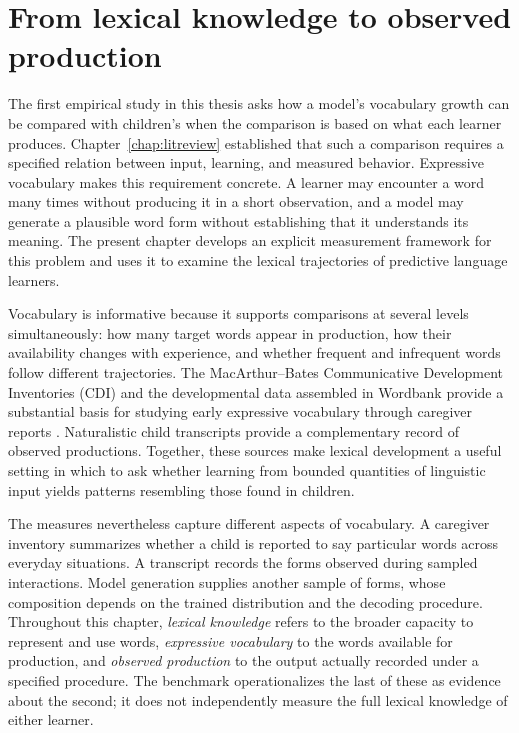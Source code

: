 \section{From lexical knowledge to observed production}
\label{sec:ch3:chapter-introduction}

The first empirical study in this thesis asks how a model's vocabulary growth can be compared with children's when the comparison is based on what each learner produces. Chapter~\ref{chap:litreview} established that such a comparison requires a specified relation between input, learning, and measured behavior. Expressive vocabulary makes this requirement concrete. A learner may encounter a word many times without producing it in a short observation, and a model may generate a plausible word form without establishing that it understands its meaning. The present chapter develops an explicit measurement framework for this problem and uses it to examine the lexical trajectories of predictive language learners.

Vocabulary is informative because it supports comparisons at several levels simultaneously: how many target words appear in production, how their availability changes with experience, and whether frequent and infrequent words follow different trajectories. The MacArthur--Bates Communicative Development Inventories (CDI) and the developmental data assembled in Wordbank provide a substantial basis for studying early expressive vocabulary through caregiver reports \citep{fenson2007macarthur,frank2017wordbank}. Naturalistic child transcripts provide a complementary record of observed productions. Together, these sources make lexical development a useful setting in which to ask whether learning from bounded quantities of linguistic input yields patterns resembling those found in children.

The measures nevertheless capture different aspects of vocabulary. A caregiver inventory summarizes whether a child is reported to say particular words across everyday situations. A transcript records the forms observed during sampled interactions. Model generation supplies another sample of forms, whose composition depends on the trained distribution and the decoding procedure. Throughout this chapter, \emph{lexical knowledge} refers to the broader capacity to represent and use words, \emph{expressive vocabulary} to the words available for production, and \emph{observed production} to the output actually recorded under a specified procedure. The benchmark operationalizes the last of these as evidence about the second; it does not independently measure the full lexical knowledge of either learner.

